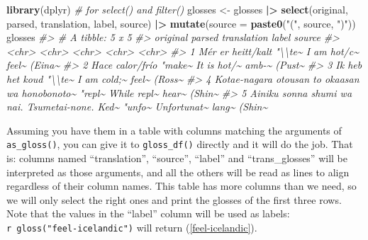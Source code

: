 \documentclass[
]{article}
\newenvironment{Shaded}{\begin{snugshade}}{\end{snugshade}}
\newcommand{\AttributeTok}[1]{\textcolor[rgb]{0.13,0.29,0.53}{#1}}
\newcommand{\CommentTok}[1]{\textcolor[rgb]{0.56,0.35,0.01}{\textit{#1}}}
\newcommand{\FunctionTok}[1]{\textcolor[rgb]{0.13,0.29,0.53}{\textbf{#1}}}
\newcommand{\NormalTok}[1]{#1}
\newcommand{\OtherTok}[1]{\textcolor[rgb]{0.56,0.35,0.01}{#1}}
\newcommand{\SpecialCharTok}[1]{\textcolor[rgb]{0.81,0.36,0.00}{\textbf{#1}}}
\newcommand{\StringTok}[1]{\textcolor[rgb]{0.31,0.60,0.02}{#1}}
\begin{document}
\begin{Shaded}
\begin{Highlighting}[]
\FunctionTok{library}\NormalTok{(dplyr) }\CommentTok{\# for select() and filter()}
\NormalTok{glosses }\OtherTok{\textless{}{-}}\NormalTok{ glosses }\SpecialCharTok{|\textgreater{}} 
  \FunctionTok{select}\NormalTok{(original, parsed, translation, label, source) }\SpecialCharTok{|\textgreater{}} 
  \FunctionTok{mutate}\NormalTok{(}\AttributeTok{source =} \FunctionTok{paste0}\NormalTok{(}\StringTok{"("}\NormalTok{, source, }\StringTok{")"}\NormalTok{))}
\NormalTok{glosses}
\CommentTok{\#\textgreater{} \# A tibble: 5 x 5}
\CommentTok{\#\textgreater{}   original                                       parsed translation label source}
\CommentTok{\#\textgreater{}   \textless{}chr\textgreater{}                                          \textless{}chr\textgreater{}  \textless{}chr\textgreater{}       \textless{}chr\textgreater{} \textless{}chr\textgreater{} }
\CommentTok{\#\textgreater{} 1 Mér er heitt/kalt                              "\textbackslash{}\textbackslash{}te\textasciitilde{} I am hot/c\textasciitilde{} feel\textasciitilde{} (Eina\textasciitilde{}}
\CommentTok{\#\textgreater{} 2 Hace calor/frío                                "make\textasciitilde{} It is hot/\textasciitilde{} amb{-}\textasciitilde{} (Pust\textasciitilde{}}
\CommentTok{\#\textgreater{} 3 Ik heb het koud                                "\textbackslash{}\textbackslash{}te\textasciitilde{} I am cold;\textasciitilde{} feel\textasciitilde{} (Ross\textasciitilde{}}
\CommentTok{\#\textgreater{} 4 Kotae{-}nagara otousan to okaasan wa honobonoto\textasciitilde{} "repl\textasciitilde{} While repl\textasciitilde{} hear\textasciitilde{} (Shin\textasciitilde{}}
\CommentTok{\#\textgreater{} 5 Ainiku sonna shumi wa nai. Tsumetai{-}none. Ked\textasciitilde{} "unfo\textasciitilde{} Unfortunat\textasciitilde{} lang\textasciitilde{} (Shin\textasciitilde{}}
\end{Highlighting}
\end{Shaded}

\begin{Shaded}
\end{Shaded}

Assuming you have them in a table with columns matching the arguments of \texttt{as\_gloss()}, you can give it to \texttt{gloss\_df()} directly and it will do the job. That is: columns named ``translation'', ``source'', ``label'' and ``trans\_glosses'' will be interpreted as those arguments, and all the others will be read as lines to align regardless of their column names.
This table has more columns than we need, so we will only select the right ones and print the glosses of the first three rows. Note that the values in the ``label'' column will be used as labels: \texttt{\textasciigrave{}r\ gloss("feel-icelandic")\textasciigrave{}} will return (\ref{feel-icelandic}).
\end{document}
